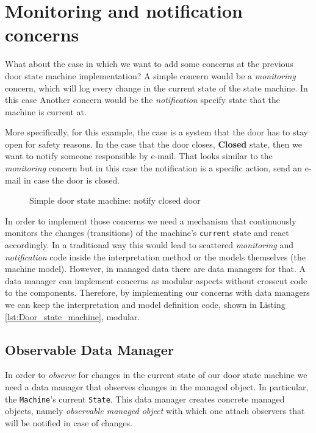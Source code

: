 \section{Monitoring and notification concerns}
What about the case in which we want to add some concerns at the previous door state machine implementation?
A simple concern would be a \textit{monitoring} concern, which will log every change in the current state of the state machine.
In this case 
Another concern would be the \textit{notification} specify state that the machine is current at.

More specifically, for this example, the case is a system that the door has to stay open for safety reasons. 
In the case that the door closes, \textbf{Closed} state, then we want to notify someone responsible by e-mail.
That looks similar to the \textit{monitoring} concern but in this case the notification is a specific action, send an e-mail in case the door is closed.

\begin{figure}[H]
	\centering
  	\caption{Simple door state machine: notify closed door}
  	\label{fig:State_machine_danger}
\end{figure}

In order to implement those concerns we need a mechanism that continuously monitors the changes (transitions) of the machine's \texttt{current} state and react accordingly.
In a traditional way this would lead to scattered \textit{monitoring} and \textit{notification} code inside the interpretation method or the models themselves (the machine model).
However, in managed data there are data managers for that.
A data manager can implement concerns as modular aspects without crosscut code to the components.
Therefore, by implementing our concerns with data managers we can keep the interpretation and model definition code, shown in Listing \ref{lst:Door_state_machine}, modular.

\subsection{Observable Data Manager}
In order to \textit{observe} for changes in the current state of our door state machine we need a data manager that observes changes in the managed object.
In particular, the \texttt{Machine}'s current \texttt{State}.
This data manager creates concrete managed objects, namely \textit{observable managed object} with which one attach observers that will be notified in case of changes.


